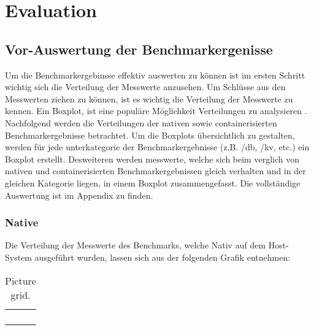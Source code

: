 \chapter{Evaluation}

\section{Vor-Auswertung der Benchmarkergenisse}

Um die Benchmarkergebinsse effektiv auswerten zu können ist im ersten Schritt wichtig sich die Verteilung der Messwerte anzusehen. Um Schlüsse aus den Messwerten ziehen zu können, ist es wichtig die Verteilung der Messwerte zu kennen. Ein Boxplot, ist eine populäre Möglichkeit Verteilungen zu analysieren \cite[Vgl. 1]{majawExploringDataDistributions2023}. Nachfolgend werden die Verteilungen der nativen sowie containerisierten Benchmarkergebnisse betrachtet. Um die Boxplots übersichtlich zu gestalten, werden für jede unterkategorie der Benchmarkergebnisse (z.B. /db, /kv, etc.) ein Boxplot erstellt. Desweiteren werden messwerte, welche sich beim verglich von nativen und containerisierten Benchmarkergebnissen gleich verhalten und in der gleichen Kategorie liegen, in einem Boxplot zusammengefasst. Die vollständige Auswertung ist im Appendix zu finden. 

\subsection{Native}

Die Verteilung der Messwerte des Benchmarks, welche Nativ auf dem Host-System ausgeführt wurden, lassen sich aus der folgenden Grafik entnehmen:

\begin{table}
    \centering
    \caption{Picture grid.\label{tab:picturegrid}}
        \begin{tabular}{c c}
            
            &  \\
              
            &  \\
             
            &  \\
             
            & 
        \end{tabular}%
\end{table}

